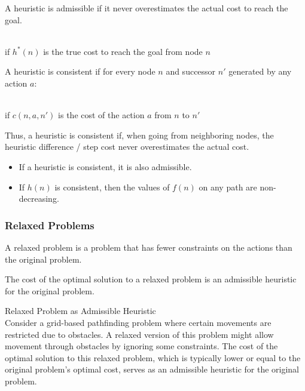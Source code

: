\documentclass[
../EiKI_Summary.tex,
]
{subfiles}
\begin{document}
\begin{defbox}
    A heuristic is admissible if it never overestimates the actual cost to reach the goal.
    
    \begin{center}
        \\
        if $h^*(n)$ is the true cost to reach the goal from node $n$
    \end{center}
\end{defbox}

\begin{defbox}
    A heuristic is consistent if for every node $n$ and successor $n'$ generated by any action $a$: 
    \begin{center}
        \\
        if $c(n, a, n')$ is the cost of the action $a$ from $n$ to $n'$
    \end{center}
    Thus, a heuristic is consistent if, when going from neighboring nodes, the heuristic difference / step cost never overestimates the actual cost.
\end{defbox}

\begin{defbox}
    [Lemmas]
    \begin{itemize}
        \item If a heuristic is consistent, it is also admissible.
        \item If $h(n)$ is consistent, then the values of $f(n)$ on any path are non-decreasing.
    \end{itemize}
\end{defbox}

\subsubsection{Relaxed Problems}
\begin{defbox*}
    A relaxed problem is a problem that has fewer constraints on the actions than the original problem.
\end{defbox*}

The cost of the optimal solution to a relaxed problem is an admissible heuristic for the original problem.

 Relaxed Problem as Admissible Heuristic\\
    Consider a grid-based pathfinding problem where certain movements are restricted due to obstacles. A relaxed version of this problem might allow movement through obstacles by ignoring some constraints. The cost of the optimal solution to this relaxed problem, which is typically lower or equal to the original problem's optimal cost, serves as an admissible heuristic for the original problem.
\end{document}

